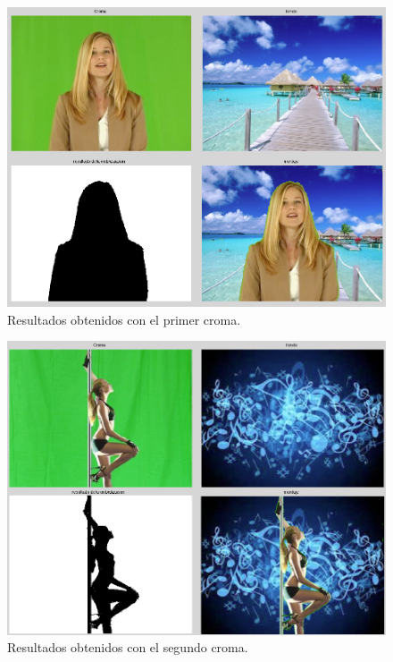 \documentclass{article}
\begin{document}
\begin{figure}[h]
  \centering
    \includegraphics[width=1\textwidth]{img/p7c_test1.png}
  \caption{Resultados obtenidos con el primer croma.}
  \label{fig:p7c:test1}
\end{figure}

\begin{figure}[h]
  \centering
    \includegraphics[width=1\textwidth]{img/p7c_test2.png}
  \caption{Resultados obtenidos con el segundo croma.}
  \label{fig:p7c:test2}
\end{figure}
\end{document}
